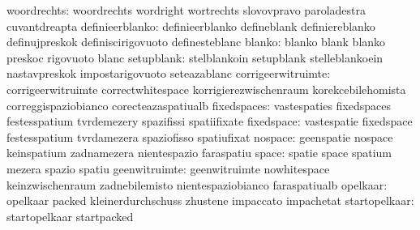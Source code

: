                      woordrechts: woordrechts                      wordright
                                  wortrechts                       slovovpravo
                                  paroladestra                     cuvantdreapta
                 definieerblanko: definieerblanko                  defineblank
                                  definiereblanko                  definujpreskok
                                  definiscirigovuoto               definesteblanc
                          blanko: blanko                           blank
                                  blanko                           preskoc
                                  rigovuoto                        blanc
                      setupblank: stelblankoin                     setupblank
                                  stelleblankoein                  nastavpreskok
                                  impostarigovuoto                 seteazablanc
              corrigeerwitruimte: corrigeerwitruimte               correctwhitespace
                                  korrigierezwischenraum           korekcebilehomista
                                  correggispaziobianco             corecteazaspatiualb
                     fixedspaces: vastespaties                     fixedspaces
                                  festesspatium                    tvrdemezery
                                  spazifissi                       spatiifixate
                      fixedspace: vastespatie                      fixedspace
                                  festesspatium                    tvrdamezera
                                  spaziofisso                      spatiufixat
                         nospace: geenspatie                       nospace
                                  keinspatium                      zadnamezera
                                  nientespazio                     faraspatiu
                           space: spatie                           space
                                  spatium                          mezera
                                  spazio                           spatiu
                   geenwitruimte: geenwitruimte                    nowhitespace
                                  keinzwischenraum                 zadnebilemisto
                                  nientespaziobianco               faraspatiualb
                        opelkaar: opelkaar                         packed
                                  kleinerdurchschuss               zhustene
                                  impaccato                        impachetat
                   startopelkaar: startopelkaar                    startpacked
